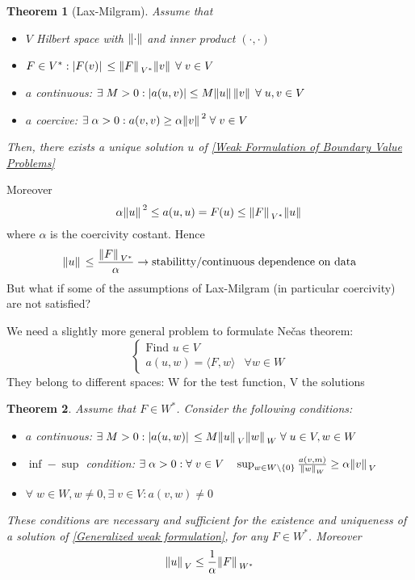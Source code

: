 \documentclass[a4paper,12pt]{article}
\theoremstyle{break}
\newtheorem{theorem}{Theorem}[section]
\newcommand*{\txt}[1]{\text{#1}}
\newcommand{\normdot}{\norm{\cdot}}
\newcommand{\scalarproduct}[2]{\langle #1,#2 \rangle}
\numberwithin{equation}{section}
\begin{document}
\begin{theorem}[Lax-Milgram]
    Assume that 
    \begin{itemize}
        \item \(V\) Hilbert space with \(\normdot\) and inner product \((\cdot, \cdot)\)
        \item \(F \in V^*: \abs*{F(v)} \leq \norm*{F}_{V^*}\norm*{v} \; \forall \; v \in V\)
        \item \(a\) continuous: \(\exists \; M > 0: \abs{a(u,v)} \leq M \norm*{u}\norm*{v} \; \forall \; u,v \in V\)
        \item \(a\) coercive: \(\exists \; \alpha > 0: a(v,v) \geq \alpha\norm*{v}^2 \; \forall \; v \in V\)
    \end{itemize}
    Then, there exists a unique solution \(u\) of \ref*{Weak Formulation of Boundary Value Problems}
\end{theorem}
Moreover 
\[
    \alpha \norm*{u}^2 \leq a(u,u) = F(u) \leq \norm*{F}_{V^*} \norm*{u}
\]
where \(\alpha\) is the coercivity costant. Hence
\[
    \norm*{u} \leq \frac{\norm*{F}_{V^*}}{\alpha} \to \txt{stabilitty/continuous dependence on data}
\]
But what if some of the assumptions of Lax-Milgram (in particular coercivity) are not satisfied?

We need a slightly more general problem to formulate Nečas theorem:
\begin{equation}
    \begin{cases}
        \txt{Find } u \in V \\
        a(u,w) = \scalarproduct{F}{w} & \forall w \in W \label{Generalized weak formulation}
    \end{cases}
\end{equation}
They belong to different spaces: W for the test function, V the solutions
\begin{theorem}
    Assume that \(F \in W^*\). Consider the following conditions:
    \begin{itemize}
        \item \(a\) continuous: \(\exists \; M > 0: \abs*{a(u,w)} \leq M \norm*{u}_V \norm*{w}_W \; \forall \; u \in V, w \in W\)
        \item \(\inf-\sup\) condition: \(\exists \; \alpha > 0: \forall \; v \in V \quad \sup_{w \in W \setminus \left\{0\right\}} \frac{a(v,m)}{\norm*{w}_W} \geq \alpha \norm*{v}_V\)
        \item \(\forall \; w \in W, w \neq 0, \exists \; v \in V : a(v,w) \neq 0\)
    \end{itemize}
    These conditions are necessary and sufficient for the existence and uniqueness of a solution of \ref*{Generalized weak formulation}, for any \(F \in W^*\). Moreover 
    \[
        \norm*{u}_V \leq \frac{1}{\alpha}\norm*{F}_{W^*}
    \]
\end{theorem}
\end{document}
